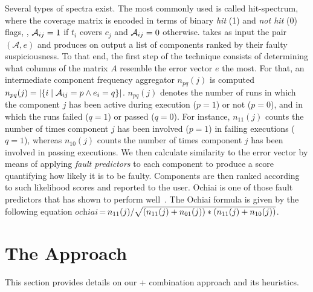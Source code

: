 \documentclass{article}
\begin{document}
Several types of spectra exist.  The most commonly used is called
hit-spectrum, where the coverage matrix is encoded in terms of binary
\emph{hit} (1) and \emph{not hit} (0) flags, \ie{}, $\mathcal{A}_{ij} = 1$ if
$t_i$ covers $c_j$ and $\mathcal{A}_{ij} = 0$ otherwise.  \sfl{} takes as input
the pair $(\mathcal{A},e)$ and produces on output a list of components
ranked by their faulty suspiciousness. To that end, the first step of
the technique consists of determining what columns of the matrix $A$
resemble the error vector $e$ the most.  For that, an intermediate
component frequency aggregator $n_{pq}(j)$ is computed $n_{pq}(j) =
|\{i\mid \mathcal{A}_{ij}=p \wedge e_i=q\}|$. $n_{pq}(j)$ denotes the number of
runs in which the component $j$ has been active during execution ($p =
1$) or not ($p=0$), and in which the runs failed ($q = 1$) or passed
($q = 0$).  For instance, $n_{11}(j)$ counts the number of times
component $j$ has been involved ($p = 1$) in failing executions ($q =
1$), whereas $n_{10}(j)$ counts the number of times component $j$ has
been involved in passing executions. We then calculate similarity to
the error vector by means of applying \emph{fault predictors} to each
component to produce a score quantifying how likely it is to be
faulty.  Components are then ranked according to such likelihood
scores and reported to the user. Ochiai is one of those fault
predictors that has shown to perform
well~\cite{7390282,Pearson:2017:EIF:3097368.3097441}. The Ochiai
formula is given by the following equation
$\textit{ochiai}\,$=$\,n_{11}(j)/\sqrt{(n_{11}(j)+n_{01}(j)) * (n_{11}(j)+n_{10}(j))}$.

\section{The \comb{} Approach}
\label{sec:approach}

This section provides details on our \sfl{}+\ds{} combination approach
and its heuristics.

\end{document}
